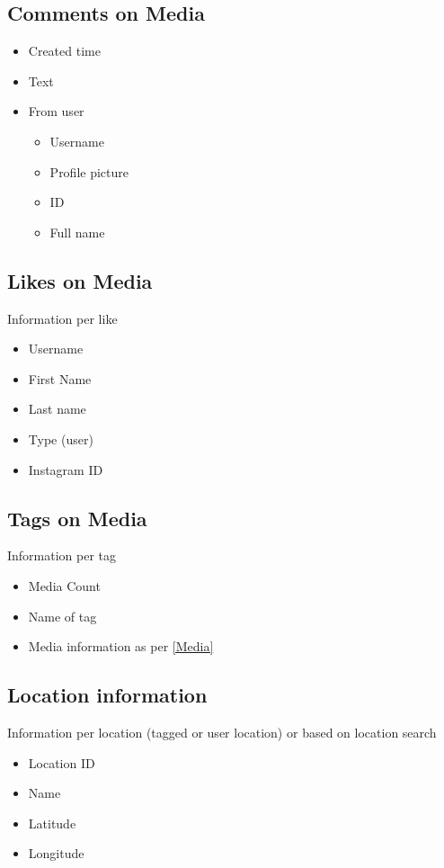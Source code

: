 \documentclass{article}
\begin{document}
\subsection{Comments on Media}\label{comment}
\begin{itemize}
	\item Created time
	\item Text
	\item From user
	\begin{itemize}
		\item Username
		\item Profile picture
		\item ID
		\item Full name
	\end{itemize}
\end{itemize}
\subsection{Likes on Media}
Information per like 
\begin{itemize}
	\item Username
	\item First Name
	\item Last name
	\item Type (user)
	\item Instagram ID
\end{itemize}

\subsection{Tags on Media}
Information per tag
\begin{itemize}
	\item Media Count
	\item Name of tag
	\item Media information as per \ref{Media}
\end{itemize}

\subsection{Location information}
Information per location (tagged or user location) or based on location search
\begin{itemize}
	\item Location ID
	\item Name
	\item Latitude 
	\item Longitude
\end{itemize}


	
\end{document}
